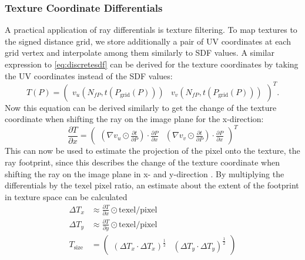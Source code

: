 \documentclass[12pt]{article}
\newcommand{\halfpow}[1]{^\frac{#1}{2}}
\newcommand{\pardiff}[2]{\frac{\partial #1}{\partial #2} }
\begin{document}
\subsubsection{Texture Coordinate Differentials}
A practical application of ray differentials is texture filtering. To map textures to the signed distance grid, we store additionally a pair of UV coordinates at each grid vertex and interpolate among them similarly to SDF values. A similar expression to \eqref{eq:discretesdf} can be derived for the texture coordinates by taking the UV coordinates instead of the SDF values:
\begin{equation}
T(P) = 
\begin{pmatrix}
v_u \left(N_{fP}, t \left(P_{\text{grid}}\left(P \right) \right) \right) &
v_v \left(N_{fP}, t \left(P_{\text{grid}}\left(P \right) \right) \right)
\end{pmatrix}^T
.\end{equation}
Now this equation can be derived similarly to get the change of the texture coordinate when shifting the ray on the image plane for the x-direction:
\begin{equation}
\pardiff{T}{x} = 
\begin{pmatrix}
\left( \nabla v_u \odot \pardiff{t}{P} \right) \cdot \pardiff{P}{x} &
\left( \nabla v_v \odot \pardiff{t}{P} \right) \cdot \pardiff{P}{x}
\end{pmatrix}^T
\end{equation}
This can now be used to estimate the projection of the pixel onto the texture, the ray footprint, since this describes the change of the texture coordinate when shifting the ray on the image plane in x- and y-direction \cite{Igehy:1999}. By multiplying the differentials by the texel pixel ratio, an estimate about the extent of the footprint in texture space can be calculated
\begin{equation}
\begin{aligned}
\Delta T_x &\approx \pardiff{T}{x} \odot \text{texel}/\text{pixel} \\[0.6em]
\Delta T_y &\approx \pardiff{T}{y} \odot \text{texel}/\text{pixel} \\[0.6em]
T_{\text{size}} &= 
\begin{pmatrix}
\left( \Delta T_x \cdot \Delta T_x \right) \halfpow{1} &
\left( \Delta T_y \cdot \Delta T_y \right) \halfpow{1}
\end{pmatrix}
\end{aligned}
\end{equation}
\end{document}
